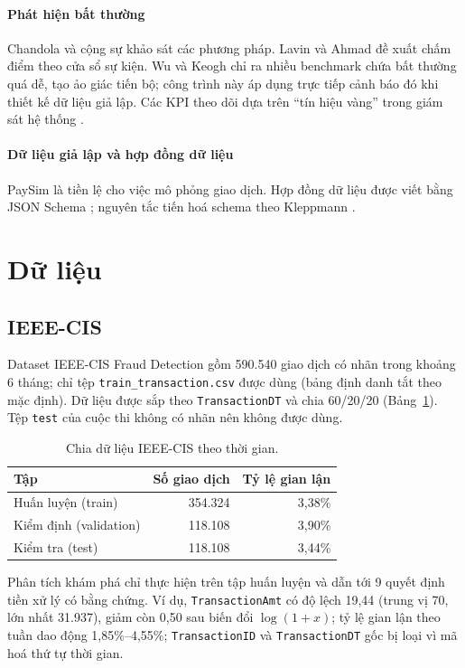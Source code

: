 \documentclass[11pt,a4paper]{article}
\theoremstyle{definition}
\theoremstyle{remark}
\newcommand{\code}[1]{\texttt{#1}}
\numberwithin{equation}{section}
\begin{document}
\paragraph{Phát hiện bất thường} Chandola và cộng sự \cite{chandola} khảo sát các phương pháp. Lavin và Ahmad \cite{lavin} đề xuất chấm điểm theo cửa sổ sự kiện. Wu và Keogh \cite{wu} chỉ ra nhiều benchmark chứa bất thường quá dễ, tạo ảo giác tiến bộ; công trình này áp dụng trực tiếp cảnh báo đó khi thiết kế dữ liệu giả lập. Các KPI theo dõi dựa trên ``tín hiệu vàng'' trong giám sát hệ thống \cite{sre}.

\paragraph{Dữ liệu giả lập và hợp đồng dữ liệu} PaySim \cite{paysim} là tiền lệ cho việc mô phỏng giao dịch. Hợp đồng dữ liệu được viết bằng JSON Schema \cite{jsonschema}; nguyên tắc tiến hoá schema theo Kleppmann \cite{kleppmann}.

\section{Dữ liệu}
\subsection{IEEE-CIS}
Dataset IEEE-CIS Fraud Detection \cite{ieee} gồm 590.540 giao dịch có nhãn trong khoảng 6 tháng; chỉ tệp \code{train\_transaction.csv} được dùng (bảng định danh tắt theo mặc định). Dữ liệu được sắp theo \code{TransactionDT} và chia 60/20/20 (Bảng~\ref{tab:split}). Tệp \code{test} của cuộc thi không có nhãn nên không được dùng.

\begin{table}[H]\centering
\caption{Chia dữ liệu IEEE-CIS theo thời gian.}\label{tab:split}
\begin{tabular}{@{}lrr@{}}
\toprule
Tập & Số giao dịch & Tỷ lệ gian lận \\ \midrule
Huấn luyện (train) & 354.324 & 3,38\% \\
Kiểm định (validation) & 118.108 & 3,90\% \\
Kiểm tra (test) & 118.108 & 3,44\% \\ \bottomrule
\end{tabular}
\end{table}

Phân tích khám phá chỉ thực hiện trên tập huấn luyện và dẫn tới 9 quyết định tiền xử lý có bằng chứng. Ví dụ, \code{TransactionAmt} có độ lệch 19,44 (trung vị 70, lớn nhất 31.937), giảm còn 0,50 sau biến đổi $\log(1+x)$; tỷ lệ gian lận theo tuần dao động 1,85\%--4,55\%; \code{TransactionID} và \code{TransactionDT} gốc bị loại vì mã hoá thứ tự thời gian.
\end{document}
